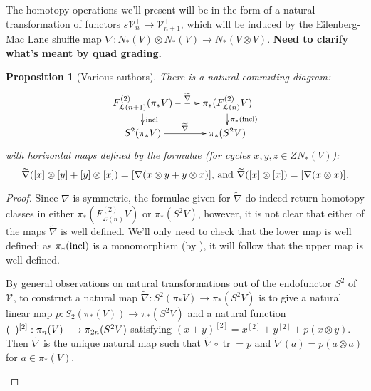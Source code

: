 \documentclass[11pt]{amsart}
\theoremstyle{plain}
\newtheorem{prop}[thm]{Proposition}
\theoremstyle{definition}
\DeclareMathOperator{\trace}{tr}
\newcommand{\DASH}{\textup{--}}
\renewcommand{\to}{\longrightarrow}
\newcommand{\calL}{\mathcal{L}}
\newcommand{\calV}{\mathcal{V}}
\theoremstyle{plain}
\newcommand{\restn}[1]{#1^{[2]}}
\newcommand{\vect}[2]{\calV^{#1}_{#2}}
\begin{document}
\begin{homotopy operations for PRLs}
The homotopy operations we'll present will be in the form of a natural transformation of functors $s\vect{+}{n}\to \vect{+}{n+1}$, which will be induced by the Eilenberg-Mac Lane shuffle map $\nabla:N_*(V)\otimes N_*(V)\to N_*(V\otimes V)$. \textbf{Need to clarify what's meant by quad grading.}
\begin{prop}[Various authors]\label{the top homotopy operations for Lie algebras}
There is a natural commuting diagram:
\[\xymatrix@R=4mm{
F^{(2)}_{\calL(n+1)}(\pi_*V)\ar@{-->}[r]^-{\widetilde{\nabla}}
\ar[d]^-{\textup{incl}}
&%
\pi_*(F^{(2)}_{\calL(n)}V)\ar[d]^-{\pi_*(\textup{incl})}
\\%
S^2(\pi_*V)\ar[r]^-{\widetilde{\nabla}}&%
\pi_*(S^2V)%
}\]
with horizontal maps defined by the formulae (for cycles $x,y,z\in ZN_*(V)$):
\[\widetilde{\nabla}([x]\otimes[y]+[y]\otimes [x])=[\nabla(x\otimes y+y\otimes x)]\textup{, and }\widetilde{\nabla}([x]\otimes[x])=[\nabla(x\otimes x)].\]
\end{prop}
\begin{proof}
Since $\nabla$ is symmetric, the formulae given for $\widetilde{\nabla}$ do indeed return homotopy classes in either $\pi_*(F^{(2)}_{\calL(n)}V)$ or $\pi_*(S^2V)$, however, it is not clear that either of the maps $\widetilde{\nabla}$ is well defined. We'll only need to check that the lower map is well defined: as $\pi_*(\textup{incl})$ is a monomorphism (by \cite[Prop 5.6]{BousOpnsDerFun.pdf}), it will follow that the upper map is well defined. 
\begin{shaded}\tiny
By general observations on natural transformations out of the endofunctor $S^2$ of $\vect{}{}$, to construct a natural map $\widetilde{\nabla}:S^2(\pi_*V)\to\pi_*(S^2V)$ is to give a natural linear map $p:S_2(\pi_*(V))\to \pi_*(S^2V)$ and a natural function $\restn{(\DASH)}:\pi_n(V)\to \pi_{2n}(S^2V)$ satisfying $\restn{(x+y)}=\restn{x}+\restn{y}+p(x\otimes y)$. Then $\widetilde{\nabla}$ is the unique natural map such that $\widetilde{\nabla}\circ\trace=p$ and $\widetilde{\nabla}(a)=p(a\otimes a)$ for $a\in\pi_*\left(V\right)$.

\end{shaded}
\end{proof}
\end{homotopy operations for PRLs}
\end{document}
